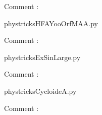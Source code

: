    Comment : 

    \clearpage
    


    \newcommand{\CaptionFigHFAYooOrfMAA}{<+Type your caption here+>}
    \begin{center}
        
    \end{center}
    phystricksHFAYooOrfMAA.py

    Comment : 

    \clearpage
    


    \newcommand{\CaptionFigExSinLarge}{<+Type your caption here+>}
    \begin{center}
        
    \end{center}
    phystricksExSinLarge.py

    Comment : 

    \clearpage
    


    \newcommand{\CaptionFigCycloideA}{<+Type your caption here+>}
    \begin{center}
        
    \end{center}
    phystricksCycloideA.py

    Comment : 

    \clearpage
    
